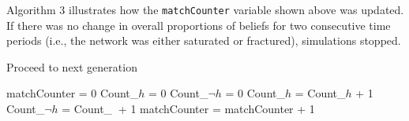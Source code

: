 \documentclass[doc,floatsintext]{apa6}
\begin{document}
Algorithm 3 illustrates how the {\tt matchCounter} variable shown above was updated. If there was no change in overall proportions of beliefs for two consecutive time periods (i.e., the network was either saturated or fractured), simulations stopped.

\begin{algorithm}[H]
\caption{Proceed to next generation}\label{proceed}
\begin{algorithmic}[1]
    \State matchCounter = 0 
    \State Count_{\(h\)} = 0
    \State Count_{\(\neg h\)} = 0
            \State Count_{\(h\)} = Count_{\(h\)} + 1
        \EndIf
            \State Count_{\(\neg h\)} = Count_{\(\ \)} + 1
        \EndIf
    \EndFor
        \State matchCounter = matchCounter + 1
    \EndIf
  \EndProcedure
\end{algorithmic}
\end{algorithm}

\newpage



\end{document}
